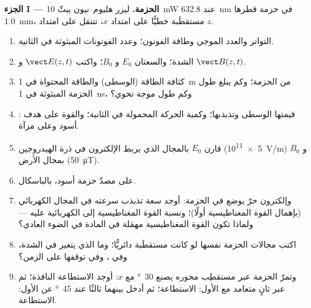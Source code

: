 \begin{problem}
\label{pb:b2:plane-waves-polarization:1}

\medskip
\noindent\textbf{الجزء I --- الحزمة.}
ليزر هليوم--نيون يبثّ \qty{10}{mW} عند \qty{632.8}{nm} في حزمة
قطرها \qty{1.0}{mm}، مستقطَبة خطيًّا على امتداد $x$، تنتقل على امتداد
$z$.
\begin{enumerate}
  \item التواتر والعدد الموجي وطاقة الفوتون؛ وعدد الفوتونات المبثوثة في
        الثانية.
  \item الشدة؛ والسعتان $E_0$ و $B_0$؛ واكتب $\vect E(z, t)$ و
        $\vect B(z, t)$.
  \item كثافة الطاقة (الوسطى) والطاقة المحتواة في \qty{1}{m} من
        الحزمة؛ وكم يبلغ طول الحزمة المبثوثة في \qty{1}{ns}، وكم
        طول موجة تحوي؟
  \item {}: قيمتها الوسطى وتذبذبها؛ وكمية الحركة
        المحمولة في الثانية؛ والقوة على هدف أسود وعلى مرآة.
  \item قارن $E_0$ بالمجال الذي يربط الإلكترون في
        ذرة الهيدروجين (\qty{5e11}{V/m}) و $B_0$ بمجال الأرض
        (\qty{50}{\micro T}).
  \item {} على مصدّ حزمة أسود، بالباسكال.
  \item وإلكترون حرّ يوضع في الحزمة: أوجد سعة تذبذب
        سرعته في المجال الكهربائي (بإهمال القوة المغناطيسية
        أولًا)؛ ونسبة القوة المغناطيسية إلى الكهربائية عليه ---
        ولماذا تكون القوة المغناطيسية مهمَلة في المادة في الضوء العادي؟
  \item اكتب مجالات الحزمة نفسها لو كانت مستقطَبة
        دائريًّا؛ وما الذي يتغير في الشدة، وفي ، وفي توقفها على الزمن؟
  \item وتمرّ الحزمة عبر مستقطِب محوره يصنع
        \qty{30}{\degree} مع $x$: أوجد الاستطاعة النافذة؛ ثم عبر ثانٍ
        متعامد مع الأول: الاستطاعة؛ ثم أدخل بينهما
        ثالثًا عند \qty{45}{\degree} عن الأول: الاستطاعة.
\end{enumerate}


\end{problem}
